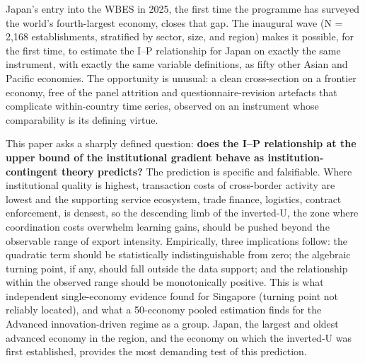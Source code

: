 \documentclass[
  12pt,a4paper]{article}
\begin{document}
Japan's entry into the WBES in 2025, the first time the programme has
surveyed the world's fourth-largest economy, closes that gap. The
inaugural wave (N = 2,168 establishments, stratified by sector, size,
and region) makes it possible, for the first time, to estimate the I--P
relationship for Japan on exactly the same instrument, with exactly the
same variable definitions, as fifty other Asian and Pacific economies.
The opportunity is unusual: a clean cross-section on a frontier economy,
free of the panel attrition and questionnaire-revision artefacts that
complicate within-country time series, observed on an instrument whose
comparability is its defining virtue.

This paper asks a sharply defined question: \textbf{does the I--P
relationship at the upper bound of the institutional gradient behave as
institution-contingent theory predicts?} The prediction is specific and
falsifiable. Where institutional quality is highest, transaction costs
of cross-border activity are lowest and the supporting service
ecosystem, trade finance, logistics, contract enforcement, is densest,
so the descending limb of the inverted-U, the zone where coordination
costs overwhelm learning gains, should be pushed beyond the observable
range of export intensity. Empirically, three implications follow: the
quadratic term should be statistically indistinguishable from zero; the
algebraic turning point, if any, should fall outside the data support;
and the relationship within the observed range should be monotonically
positive. This is what independent single-economy evidence found for
Singapore (turning point not reliably located), and what a 50-economy
pooled estimation finds for the Advanced innovation-driven regime as a
group. Japan, the largest and oldest advanced economy in the region, and
the economy on which the inverted-U was first established, provides the
most demanding test of this prediction.
\end{document}
